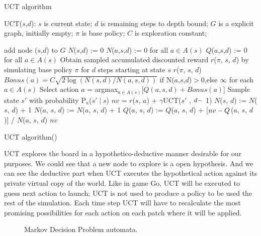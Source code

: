 \documentclass[11pt,oneside,a4paper,openright]{report}
\begin{document}
\begin{algorithm}[!ht]
\caption{UCT algorithm}\label{alg:uctAlgorithm}
		\SetAlgoLined
		\BlankLine
		UCT($s$,$d$):
		{$s$ is current state; $d$ is remaining steps to depth bound; $G$ is a explicit graph, initially empty; $\pi$ is base policy; $C$ is exploration constant;}
		\BlankLine
		
		{
		  add node ($s$,$d$) to $G$\;
		  $N$($s$,$d$) := 0\;
		  $N$($a$,$s$,$d$) := 0 for all $a \in A(s)$\;
		  $Q$($a$,$s$,$d$) := 0 for all $a \in A(s)$\;
		  Obtain sampled accumulated discounted reward $r$($\pi$, $s$, $d$)
		  by simulating base policy $\pi$ for $d$ steps starting at state $s$\;
		  \Return $r$($\pi$, $s$, $d$)\;
		}
		{		
		$Bonus(a) = C\sqrt{2\log(N(s,d)/N(a,s,d))}$ if N($a$,$s$,$d$)$>$0,else $\infty$ for each $a \in A(s)$\;
		Select action $a$ = argmax$_{a\in A(s)}$[$Q(a, s, d) + Bonus(a)$]\;
		Sample state $s'$ with probability P$_a$($s'\mid s$)\;
		$nv$ = $r$($s$, $a$) + $\gamma$UCT($s'$ , $d \--$ 1)\;
		$N$($s$, $d$) := $N$($s$, $d$) + 1\;
		$N$($a$, $s$, $d$) := $N$($a$, $s$, $d$) + 1\;
		$Q$($a$, $s$, $d$) := $Q$($a$, $s$, $d$) + [$nv \-- Q$($a$, $s$, $d$)] / $N$($a$, $s$, $d$)\;
		\Return $nv$\;
		}		
		\caption{UCT algorithm(\cite{BonetGeffner2012})}
		\end{algorithm}




UCT explores the board in a hypothetico-deductive manner desirable for our purposes. We could
see that a new node to explore is a open hypothesis. And we can see the deductive part when UCT executes the hypothetical action against its private virtual copy of the world. Like in game Go, UCT will be executed to guess next action to launch; UCT is not used to produce a policy to be used the rest of the simulation. Each time step UCT will have to recalculate the most promising possibilities for each action on each patch where it will be applied. 

\begin{figure}[h!]
\centering
\setlength\fboxsep{0pt}
\setlength\fboxrule{0.5pt}
\caption{ Markov Decision Problem automata.}
\label{fig:mdp1}
\end{figure}
\end{document}

